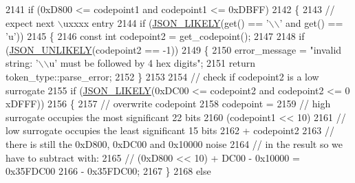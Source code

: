 \begin{DoxyCode}
2141                             \textcolor{keywordflow}{if} (0xD800 <= codepoint1 and codepoint1 <= 0xDBFF)
2142                             \{
2143                                 \textcolor{comment}{// expect next \(\backslash\)uxxxx entry}
2144                                 \textcolor{keywordflow}{if} (\hyperlink{json_8hpp_a41ecd1c4cf7c3d56477b9b685b5daa72}{JSON\_LIKELY}(\textcolor{keyword}{get}() == \textcolor{charliteral}{'\(\backslash\)\(\backslash\)'} and \textcolor{keyword}{get}() == \textcolor{charliteral}{'u'}))
2145                                 \{
2146                                     \textcolor{keyword}{const} \textcolor{keywordtype}{int} codepoint2 = get\_codepoint();
2147 
2148                                     \textcolor{keywordflow}{if} (\hyperlink{json_8hpp_ab77582407c64944e7db1ea95ab520253}{JSON\_UNLIKELY}(codepoint2 == -1))
2149                                     \{
2150                                         error\_message = \textcolor{stringliteral}{"invalid string: '\(\backslash\)\(\backslash\)u' must be followed by 4 hex
       digits"};
2151                                         \textcolor{keywordflow}{return} token\_type::parse\_error;
2152                                     \}
2153 
2154                                     \textcolor{comment}{// check if codepoint2 is a low surrogate}
2155                                     \textcolor{keywordflow}{if} (\hyperlink{json_8hpp_a41ecd1c4cf7c3d56477b9b685b5daa72}{JSON\_LIKELY}(0xDC00 <= codepoint2 and codepoint2 <= 0
      xDFFF))
2156                                     \{
2157                                         \textcolor{comment}{// overwrite codepoint}
2158                                         codepoint =
2159                                             \textcolor{comment}{// high surrogate occupies the most significant 22 bits}
2160                                             (codepoint1 << 10)
2161                                             \textcolor{comment}{// low surrogate occupies the least significant 15 bits}
2162                                             + codepoint2
2163                                             \textcolor{comment}{// there is still the 0xD800, 0xDC00 and 0x10000 noise}
2164                                             \textcolor{comment}{// in the result so we have to subtract with:}
2165                                             \textcolor{comment}{// (0xD800 << 10) + DC00 - 0x10000 = 0x35FDC00}
2166                                             - 0x35FDC00;
2167                                     \}
2168                                     \textcolor{keywordflow}{else}

\end{DoxyCode}
